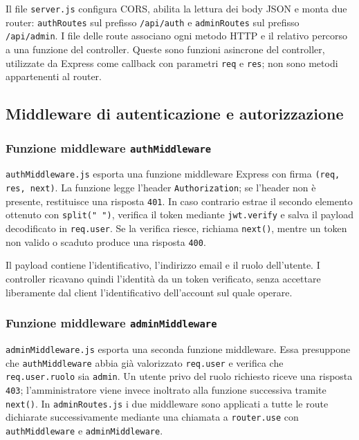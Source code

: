 \documentclass[12pt,a4paper]{article}
\begin{document}
Il file \texttt{server.js} configura CORS, abilita la lettura dei body JSON e
monta due router: \texttt{authRoutes} sul prefisso \texttt{/api/auth} e
\texttt{adminRoutes} sul prefisso \texttt{/api/admin}. I file delle route
associano ogni metodo HTTP e il relativo percorso a una funzione del controller.
Queste sono funzioni asincrone del controller, utilizzate da Express come
callback con parametri
\texttt{req} e \texttt{res}; non sono metodi appartenenti al router.

\subsection{Middleware di autenticazione e autorizzazione}

\subsubsection{Funzione middleware \texttt{authMiddleware}}
\texttt{authMiddleware.js} esporta una funzione middleware Express con firma
\texttt{(req, res, next)}. La funzione legge l'header
\texttt{Authorization}; se l'header non è presente, restituisce una risposta
\texttt{401}. In caso contrario estrae il secondo elemento ottenuto con
\texttt{split(" ")}, verifica il token mediante \texttt{jwt.verify} e salva il
payload decodificato in \texttt{req.user}. Se la verifica riesce, richiama
\texttt{next()}, mentre un token non valido o scaduto produce una risposta
\texttt{400}.

Il payload contiene l'identificativo, l'indirizzo email e il ruolo
dell'utente. I controller ricavano quindi l'identità da un token verificato,
senza accettare liberamente dal client l'identificativo dell'account sul quale
operare.

\subsubsection{Funzione middleware \texttt{adminMiddleware}}
\texttt{adminMiddleware.js} esporta una seconda funzione middleware. Essa
presuppone che \texttt{authMiddleware} abbia già valorizzato
\texttt{req.user} e verifica che \texttt{req.user.ruolo} sia
\texttt{admin}. Un utente privo del ruolo richiesto riceve una risposta
\texttt{403}; l'amministratore viene invece inoltrato alla funzione successiva
tramite \texttt{next()}. In \texttt{adminRoutes.js} i due middleware sono
applicati a tutte le route dichiarate successivamente mediante una chiamata a
\texttt{router.use} con \texttt{authMiddleware} e
\texttt{adminMiddleware}.
\end{document}
